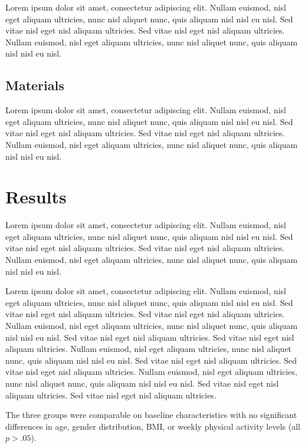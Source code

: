\documentclass[
  jou,
  floatsintext,
  longtable,
  nolmodern,
  notxfonts,
  notimes,
  colorlinks=true,linkcolor=blue,citecolor=blue,urlcolor=blue]{apa7}
\begin{document}
Lorem ipsum dolor sit amet, consectetur adipiscing elit. Nullam euismod,
nisl eget aliquam ultricies, nunc nisl aliquet nunc, quis aliquam nisl
nisl eu nisl. Sed vitae nisl eget nisl aliquam ultricies. Sed vitae nisl
eget nisl aliquam ultricies. Nullam euismod, nisl eget aliquam
ultricies, nunc nisl aliquet nunc, quis aliquam nisl nisl eu nisl.

\subsection{Materials}\label{materials}

Lorem ipsum dolor sit amet, consectetur adipiscing elit. Nullam euismod,
nisl eget aliquam ultricies, nunc nisl aliquet nunc, quis aliquam nisl
nisl eu nisl. Sed vitae nisl eget nisl aliquam ultricies. Sed vitae nisl
eget nisl aliquam ultricies. Nullam euismod, nisl eget aliquam
ultricies, nunc nisl aliquet nunc, quis aliquam nisl nisl eu nisl.

\section{Results}\label{sec-results}

Lorem ipsum dolor sit amet, consectetur adipiscing elit. Nullam euismod,
nisl eget aliquam ultricies, nunc nisl aliquet nunc, quis aliquam nisl
nisl eu nisl. Sed vitae nisl eget nisl aliquam ultricies. Sed vitae nisl
eget nisl aliquam ultricies. Nullam euismod, nisl eget aliquam
ultricies, nunc nisl aliquet nunc, quis aliquam nisl nisl eu nisl.

Lorem ipsum dolor sit amet, consectetur adipiscing elit. Nullam euismod,
nisl eget aliquam ultricies, nunc nisl aliquet nunc, quis aliquam nisl
nisl eu nisl. Sed vitae nisl eget nisl aliquam ultricies. Sed vitae nisl
eget nisl aliquam ultricies. Nullam euismod, nisl eget aliquam
ultricies, nunc nisl aliquet nunc, quis aliquam nisl nisl eu nisl. Sed
vitae nisl eget nisl aliquam ultricies. Sed vitae nisl eget nisl aliquam
ultricies. Nullam euismod, nisl eget aliquam ultricies, nunc nisl
aliquet nunc, quis aliquam nisl nisl eu nisl. Sed vitae nisl eget nisl
aliquam ultricies. Sed vitae nisl eget nisl aliquam ultricies. Nullam
euismod, nisl eget aliquam ultricies, nunc nisl aliquet nunc, quis
aliquam nisl nisl eu nisl. Sed vitae nisl eget nisl aliquam ultricies.
Sed vitae nisl eget nisl aliquam ultricies.

The three groups were comparable on baseline characteristics with no
significant differences in age, gender distribution, BMI, or weekly
physical activity levels (all \(p > .05\)).
\end{document}
